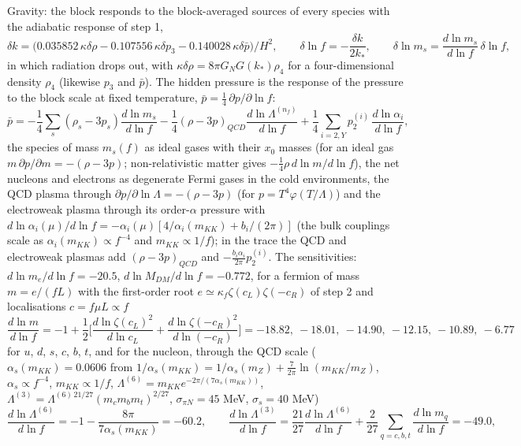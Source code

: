 \documentclass[
  10pt,
]{article}
\begin{document}
Gravity: the block responds to the block-averaged sources of every
species with the adiabatic response of step 1,
\[ \delta k = \big(0.035852\,\kappa\delta\rho - 0.107556\,\kappa\delta p_3 - 0.140028\,\kappa\delta\bar p\big)/H^2,\qquad \delta\ln f = -\frac{\delta k}{2k_*},\qquad
   \delta\ln m_s = \frac{d\ln m_s}{d\ln f}\,\delta\ln f , \] in which
radiation drops out, with \(\kappa\delta\rho = 8\pi G_NG(k_*)\rho_4\)
for a four-dimensional density \(\rho_4\) (likewise \(p_3\) and
\(\bar p\)). The hidden pressure is the response of the pressure to the
block scale at fixed temperature,
\(\bar p = \frac14\,\partial p/\partial\ln f\):
\[ \bar p = -\frac14\sum_s(\rho_s - 3p_s)\frac{d\ln m_s}{d\ln f} - \frac14(\rho - 3p)_{QCD}\frac{d\ln\Lambda^{(n_f)}}{d\ln f} + \frac14\sum_{i = 2, Y}p_2^{(i)}\,\frac{d\ln\alpha_i}{d\ln f} ,\]
the species of mass \(m_s(f)\) as ideal gases with their \(x_0\) masses
(for an ideal gas \(m\,\partial p/\partial m = -(\rho - 3p)\);
non-relativistic matter gives \(-\frac14\rho\,d\ln m/d\ln f\)), the net
nucleons and electrons as degenerate Fermi gases in the cold
environments, the QCD plasma through
\(\partial p/\partial\ln\Lambda = -(\rho - 3p)\) (for
\(p = T^4\varphi(T/\Lambda)\)) and the electroweak plasma through its
order-\(\alpha\) pressure with
\(d\ln\alpha_i(\mu)/d\ln f = -\alpha_i(\mu)[4/\alpha_i(m_{KK}) + b_i/(2\pi)]\)
(the bulk couplings scale as \(\alpha_i(m_{KK}) \propto f^{-4}\) and
\(m_{KK} \propto 1/f\)); in the trace the QCD and electroweak plasmas
add \((\rho - 3p)_{QCD}\) and \(-\frac{b_i\alpha_i}{2\pi}p_2^{(i)}\).
The sensitivities: \(d\ln m_e/d\ln f = -20.5\),
\(d\ln M_{DM}/d\ln f = -0.772\), for a fermion of mass \(m = e/(fL)\)
with the first-order root \(e \simeq \kappa_f\zeta(c_L)\zeta(-c_R)\) of
step 2 and localisations \(c = f\mu L \propto f\)
\[ \frac{d\ln m}{d\ln f} = -1 + \frac12\Big[\frac{d\ln\zeta(c_L)^2}{d\ln c_L} + \frac{d\ln\zeta(-c_R)^2}{d\ln(-c_R)}\Big] = -18.82,\ -18.01,\ -14.90,\ -12.15,\ -10.89,\ -6.77 \]
for \(u\), \(d\), \(s\), \(c\), \(b\), \(t\), and for the nucleon,
through the QCD scale (\(\alpha_s(m_{KK}) = 0.0606\) from
\(1/\alpha_s(m_{KK}) = 1/\alpha_s(m_Z) + \frac{7}{2\pi}\ln(m_{KK}/m_Z)\),
\(\alpha_s \propto f^{-4}\), \(m_{KK} \propto 1/f\),
\(\Lambda^{(6)} = m_{KK}e^{-2\pi/(7\alpha_s(m_{KK}))}\),
\(\Lambda^{(3)} = \Lambda^{(6)\,21/27}(m_cm_bm_t)^{2/27}\),
\(\sigma_{\pi N} = 45\) MeV, \(\sigma_s = 40\) MeV)
\[ \frac{d\ln\Lambda^{(6)}}{d\ln f} = -1 - \frac{8\pi}{7\alpha_s(m_{KK})} = -60.2,\qquad \frac{d\ln\Lambda^{(3)}}{d\ln f} = \frac{21}{27}\frac{d\ln\Lambda^{(6)}}{d\ln f} + \frac{2}{27}\sum_{q=c,b,t}\frac{d\ln m_q}{d\ln f} = -49.0,\]
\end{document}
